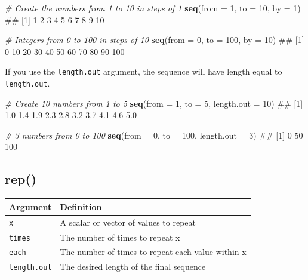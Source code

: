 \documentclass[]{book}
\newenvironment{Shaded}{\begin{snugshade}}{\end{snugshade}}
\newcommand{\KeywordTok}[1]{\textcolor[rgb]{0.13,0.29,0.53}{\textbf{{#1}}}}
\newcommand{\DataTypeTok}[1]{\textcolor[rgb]{0.13,0.29,0.53}{{#1}}}
\newcommand{\DecValTok}[1]{\textcolor[rgb]{0.00,0.00,0.81}{{#1}}}
\newcommand{\CommentTok}[1]{\textcolor[rgb]{0.56,0.35,0.01}{\textit{{#1}}}}
\newcommand{\NormalTok}[1]{{#1}}
\theoremstyle{definition}
\theoremstyle{definition}
\theoremstyle{remark}
\begin{document}
\begin{Shaded}
\begin{Highlighting}[]
\CommentTok{# Create the numbers from 1 to 10 in steps of 1}
\KeywordTok{seq}\NormalTok{(}\DataTypeTok{from =} \DecValTok{1}\NormalTok{, }\DataTypeTok{to =} \DecValTok{10}\NormalTok{, }\DataTypeTok{by =} \DecValTok{1}\NormalTok{)}
\NormalTok{##  [1]  1  2  3  4  5  6  7  8  9 10}

\CommentTok{# Integers from 0 to 100 in steps of 10}
\KeywordTok{seq}\NormalTok{(}\DataTypeTok{from =} \DecValTok{0}\NormalTok{, }\DataTypeTok{to =} \DecValTok{100}\NormalTok{, }\DataTypeTok{by =} \DecValTok{10}\NormalTok{)}
\NormalTok{##  [1]   0  10  20  30  40  50  60  70  80  90 100}
\end{Highlighting}
\end{Shaded}

If you use the \texttt{length.out} argument, the sequence will have
length equal to \texttt{length.out}.

\begin{Shaded}
\begin{Highlighting}[]
\CommentTok{# Create 10 numbers from 1 to 5}
\KeywordTok{seq}\NormalTok{(}\DataTypeTok{from =} \DecValTok{1}\NormalTok{, }\DataTypeTok{to =} \DecValTok{5}\NormalTok{, }\DataTypeTok{length.out =} \DecValTok{10}\NormalTok{)}
\NormalTok{##  [1] 1.0 1.4 1.9 2.3 2.8 3.2 3.7 4.1 4.6 5.0}

\CommentTok{# 3 numbers from 0 to 100}
\KeywordTok{seq}\NormalTok{(}\DataTypeTok{from =} \DecValTok{0}\NormalTok{, }\DataTypeTok{to =} \DecValTok{100}\NormalTok{, }\DataTypeTok{length.out =} \DecValTok{3}\NormalTok{)}
\NormalTok{## [1]   0  50 100}
\end{Highlighting}
\end{Shaded}

\subsection{rep()}\label{rep}

\begin{longtable}[]{@{}ll@{}}
\toprule
Argument & Definition\tabularnewline
\midrule
\endhead
\texttt{x} & A scalar or vector of values to repeat\tabularnewline
\texttt{times} & The number of times to repeat x\tabularnewline
\texttt{each} & The number of times to repeat each value within
x\tabularnewline
\texttt{length.out} & The desired length of the final
sequence\tabularnewline
\bottomrule
\end{longtable}
\end{document}
